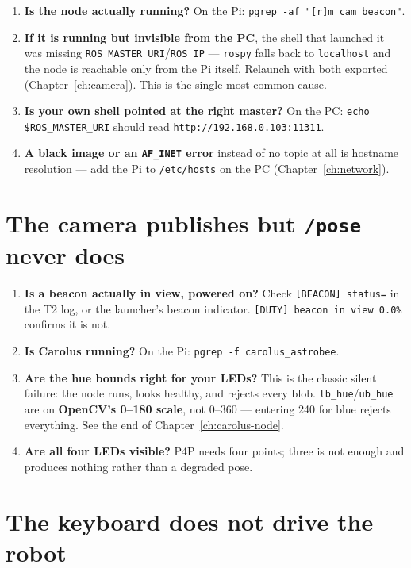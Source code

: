 \documentclass[11pt]{report}
\begin{document}
\begin{enumerate}
  \item \textbf{Is the node actually running?} On the Pi:
  \texttt{pgrep -af "[r]m\_cam\_beacon"}.
  \item \textbf{If it is running but invisible from the PC}, the shell that
  launched it was missing \texttt{ROS\_MASTER\_URI}/\texttt{ROS\_IP} ---
  \texttt{rospy} falls back to \texttt{localhost} and the node is reachable
  only from the Pi itself. Relaunch with both exported
  (Chapter~\ref{ch:camera}). This is the single most common cause.
  \item \textbf{Is your own shell pointed at the right master?} On the PC:
  \texttt{echo \$ROS\_MASTER\_URI} should read
  \texttt{http://192.168.0.103:11311}.
  \item \textbf{A black image or an \texttt{AF\_INET} error} instead of no
  topic at all is hostname resolution --- add the Pi to
  \texttt{/etc/hosts} on the PC (Chapter~\ref{ch:network}).
\end{enumerate}

\section{The camera publishes but \texttt{/pose} never does}

\begin{enumerate}
  \item \textbf{Is a beacon actually in view, powered on?} Check
  \texttt{[BEACON] status=} in the T2 log, or the launcher's beacon
  indicator. \texttt{[DUTY] beacon in view 0.0\%} confirms it is not.
  \item \textbf{Is Carolus running?} On the Pi:
  \texttt{pgrep -f carolus\_astrobee}.
  \item \textbf{Are the hue bounds right for your LEDs?} This is the classic
  silent failure: the node runs, looks healthy, and rejects every blob.
  \texttt{lb\_hue}/\texttt{ub\_hue} are on \textbf{OpenCV's 0--180 scale},
  not 0--360 --- entering 240 for blue rejects everything. See the end of
  Chapter~\ref{ch:carolus-node}.
  \item \textbf{Are all four LEDs visible?} P4P needs four points; three is
  not enough and produces nothing rather than a degraded pose.
\end{enumerate}

\section{The keyboard does not drive the robot}
\end{document}
